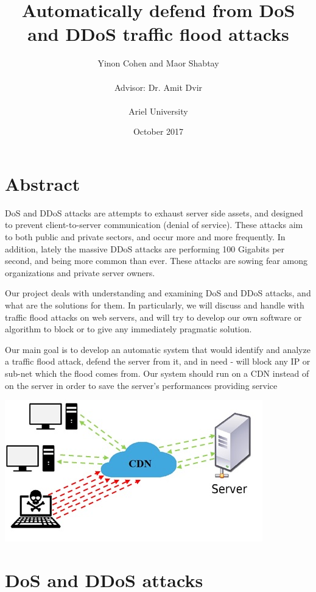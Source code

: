 \documentclass{report}
\title{Automatically defend from DoS and DDoS traffic flood attacks}
\author{Yinon Cohen and Maor Shabtay\\\\{ Advisor: Dr. Amit Dvir}\\\\{Ariel University}}
\date{October 2017}
\begin{document}
\maketitle

\tableofcontents
{}


\newpage

\chapter {Abstract}
\hfill \break DoS and DDoS attacks are attempts to exhaust server side assets, and designed to prevent client-to-server communication (denial of service). These attacks aim to both public and private sectors, and occur more and more frequently. In addition, lately the massive DDoS attacks are performing 100 Gigabits per second, and being more common than ever. These attacks are sowing fear among organizations and private server owners.

\hfill \break Our project deals with understanding and examining DoS and DDoS attacks, and what are the solutions for them. In particularly, we will discuss and handle with traffic flood attacks on web servers, and will try to develop our own software or algorithm to block or to give any immediately pragmatic solution.

\hfill \break Our main goal is to develop an automatic system that would identify and analyze a traffic flood attack, defend the server from it, and in need - will block any IP or sub-net which the flood comes from. Our system should run on a CDN instead of on the server in order to save the server’s performances providing service
\hfill \break \hfill \break
    \begin{center}
        \includegraphics{pi}
    \end{center}
\newpage
\chapter {DoS and DDoS attacks}
\end{document}
